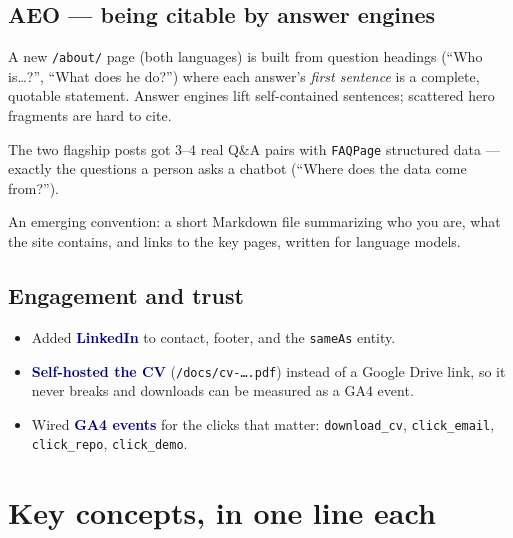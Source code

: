 \documentclass[11pt]{article}
\newcommand{\term}[1]{\textcolor{navy}{\textbf{#1}}}
\begin{document}
\subsection{AEO --- being citable by answer engines}

\begin{description}[leftmargin=0em, style=nextline]
  \item[An ``About'' page with direct answers.] A new \texttt{/about/} page
  (both languages) is built from question headings (``Who is\dots?'', ``What
  does he do?'') where each answer's \emph{first sentence} is a complete,
  quotable statement. Answer engines lift self-contained sentences; scattered
  hero fragments are hard to cite.
  \item[\texttt{FAQPage} schema on flagship projects.] The two flagship posts
  got 3--4 real Q\&A pairs with \texttt{FAQPage} structured data --- exactly the
  questions a person asks a chatbot (``Where does the data come from?'').
  \item[\texttt{llms.txt} at the root.] An emerging convention: a short Markdown
  file summarizing who you are, what the site contains, and links to the key
  pages, written for language models.
\end{description}

\subsection{Engagement and trust}

\begin{itemize}[leftmargin=1.4em]
  \item Added \term{LinkedIn} to contact, footer, and the \texttt{sameAs} entity.
  \item \term{Self-hosted the CV} (\texttt{/docs/cv-\dots.pdf}) instead of a
  Google Drive link, so it never breaks and downloads can be measured as a GA4
  event.
  \item Wired \term{GA4 events} for the clicks that matter: \texttt{download\_cv},
  \texttt{click\_email}, \texttt{click\_repo}, \texttt{click\_demo}.
\end{itemize}

\section{Key concepts, in one line each}
\end{document}
